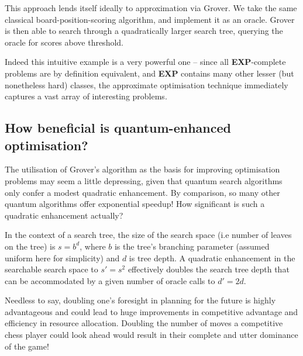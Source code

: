 This approach lends itself ideally to approximation via Grover. We take the same classical board-position-scoring algorithm, and implement it as an oracle. Grover is then able to search through a quadratically larger search tree, querying the oracle for scores above threshold.

Indeed this intuitive example is a very powerful one -- since all \textbf{EXP}-complete problems are by definition equivalent, and \textbf{EXP} contains many other lesser (but nonetheless hard) classes, the approximate optimisation technique immediately captures a vast array of interesting problems.

\subsection{How beneficial is quantum-enhanced optimisation?}

The utilisation of Grover's algorithm as the basis for improving optimisation problems may seem a little depressing, given that quantum search algorithms only confer a modest quadratic enhancement. By comparison, so many other quantum algorithms offer exponential speedup! How significant is such a quadratic enhancement actually?

In the context of a search tree, the size of the search space (i.e number of leaves on the tree) is \mbox{$s=b^d$},
where $b$ is the tree's branching parameter (assumed uniform here for simplicity) and $d$ is tree depth. A quadratic enhancement in the searchable search space to \mbox{$s'=s^2$} effectively doubles the search tree depth that can be accommodated by a given number of oracle calls to \mbox{$d'=2d$}.

Needless to say, doubling one's foresight in planning for the future is highly advantageous and could lead to huge improvements in competitive advantage and efficiency in resource allocation. Doubling the number of moves a competitive chess player could look ahead would result in their complete and utter dominance of the game!

